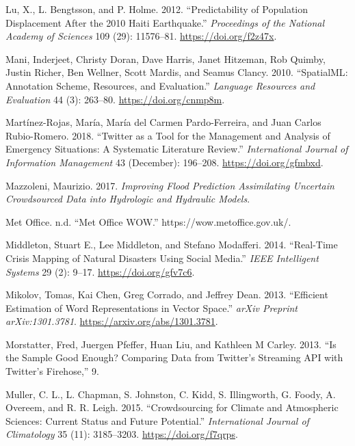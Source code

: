 \documentclass[a4paper, notitlepage]{extreport}
\newlength{\cslhangindent}
\newenvironment{CSLReferences}[2] %
 {%
  \setlength{\parindent}{0pt}
  \ifodd #1 \everypar{\setlength{\hangindent}{\cslhangindent}}\ignorespaces\fi
  \ifnum #2 > 0
  \setlength{\parskip}{#2\baselineskip}
  \fi
 }%
 {}
\begin{document}
\begin{CSLReferences}{1}{0}
\leavevmode{}%
Lu, X., L. Bengtsson, and P. Holme. 2012. {``Predictability of
Population Displacement After the 2010 {Haiti} Earthquake.''}
\emph{Proceedings of the National Academy of Sciences} 109 (29):
11576--81. \url{https://doi.org/f2z47x}.

\leavevmode{}%
Mani, Inderjeet, Christy Doran, Dave Harris, Janet Hitzeman, Rob Quimby,
Justin Richer, Ben Wellner, Scott Mardis, and Seamus Clancy. 2010.
{``{SpatialML}: Annotation Scheme, Resources, and Evaluation.''}
\emph{Language Resources and Evaluation} 44 (3): 263--80.
\url{https://doi.org/cnmp8m}.

\leavevmode{}%
Martínez-Rojas, María, María del Carmen Pardo-Ferreira, and Juan Carlos
Rubio-Romero. 2018. {``Twitter as a Tool for the Management and Analysis
of Emergency Situations: {A} Systematic Literature Review.''}
\emph{International Journal of Information Management} 43 (December):
196--208. \url{https://doi.org/gfmbxd}.

\leavevmode{}%
Mazzoleni, Maurizio. 2017. \emph{Improving {Flood Prediction
Assimilating Uncertain Crowdsourced Data} into {Hydrologic} and
{Hydraulic Models}}.

\leavevmode{}%
Met Office. n.d. {``Met {Office WOW}.''} https://wow.metoffice.gov.uk/.

\leavevmode{}%
Middleton, Stuart E., Lee Middleton, and Stefano Modafferi. 2014.
{``Real-{Time Crisis Mapping} of {Natural Disasters Using Social
Media}.''} \emph{IEEE Intelligent Systems} 29 (2): 9--17.
\url{https://doi.org/gfv7c6}.

\leavevmode{}%
Mikolov, Tomas, Kai Chen, Greg Corrado, and Jeffrey Dean. 2013.
{``Efficient Estimation of Word Representations in Vector Space.''}
\emph{arXiv Preprint arXiv:1301.3781}.
\url{https://arxiv.org/abs/1301.3781}.

\leavevmode{}%
Morstatter, Fred, Juergen Pfeffer, Huan Liu, and Kathleen M Carley.
2013. {``Is the {Sample Good Enough}? {Comparing Data} from {Twitter}'s
{Streaming API} with {Twitter}'s {Firehose},''} 9.

\leavevmode{}%
Muller, C. L., L. Chapman, S. Johnston, C. Kidd, S. Illingworth, G.
Foody, A. Overeem, and R. R. Leigh. 2015. {``Crowdsourcing for Climate
and Atmospheric Sciences: Current Status and Future Potential.''}
\emph{International Journal of Climatology} 35 (11): 3185--3203.
\url{https://doi.org/f7qrps}.


\end{CSLReferences}
\end{document}
